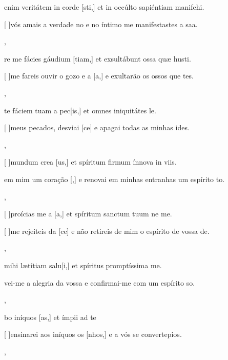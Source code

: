 {  {\item {} enim veritátem in corde [sti,] et in occúlto sapiéntiam manifehi.}%
    {\item {}[ ]{vós} amais a verdade no  e no íntimo me manifestastes a saa.},
  {\item {}re me fácies gáudium [tiam,] et exsultábunt ossa quæ husti.}%
    {\item {}[ ]{me} fareis ouvir o gozo e a [a,] e exultarão os ossos que tes.},
  {\item {}te fáciem tuam a pec[is,] et omnes iniquitátes le.}%
    {\item {}[ ]{meus} pecados, desviai [ce] e apagai todas as minhas ides.},
  {\item {}[ ]{mun}dum crea [us,] et spíritum firmum ínnova in viis.}%
    {\item {} em mim um coração [,] e renovai em minhas entranhas um espírito to.},
  {\item {}[ ]{pro}ícias me a [a,] et spíritum sanctum tuum ne  me.}%
    {\item {}[ ]{me} rejeiteis da [ce] e não retireis de mim o espírito de vossa de.},
  {\item {} mihi lætítiam salu[i,] et spíritus promptíssima me.}%
    {\item {}vei-me a alegria da vossa  e confir\-mai-me com um espírito so.},
  {\item {}bo iníquos [as,] et ímpii ad te }%
    {\item {}[ ]{en}sinarei aos iníquos os [nhos,] e a vós se convertepios.},
}
